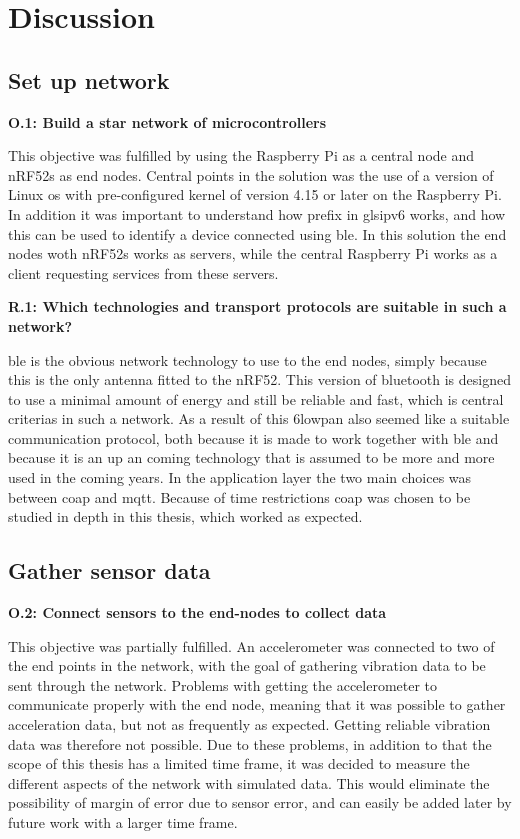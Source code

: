 \chapter{Discussion}
\label{chp:dataAnalysis}

\section{Set up network}

\noindent \textbf{O.1: Build a star network of microcontrollers}

This objective was fulfilled by using the Raspberry Pi as a central node and nRF52s as end nodes. Central points in the solution was the use of a version of Linux \gls{os} with pre-configured kernel of version 4.15 or later on the \gls{Raspberry Pi}. In addition it was important to understand how prefix in gls{ipv6} works, and how this can be used to identify a device connected using \gls{ble}. In this solution the end nodes woth \glspl{nRF52} works as servers, while the central Raspberry Pi works as a client requesting services from these servers. 


\noindent \textbf{R.1: Which technologies and transport protocols are suitable in such a network?}

\gls{ble} is the obvious network technology to use to the end nodes, simply because this is the only antenna fitted to the nRF52. This version of bluetooth is designed to use a minimal amount of energy and still be reliable and fast, which is central criterias in such a network. As a result of this \gls{6lowpan} also seemed like a suitable communication protocol, both because it is made to work together with \gls{ble} and because it is an up an coming technology that is assumed to be more and more used in the coming years. In the application layer the two main choices was between \gls{coap} and \gls{mqtt}. Because of time restrictions \gls{coap} was chosen to be studied in depth in this thesis, which worked as expected. 

\newpage


\section{Gather sensor data}

\noindent\textbf{O.2: Connect sensors to the end-nodes to collect data}

This objective was partially fulfilled. An accelerometer was connected to two of the end points in the network, with the goal of gathering vibration data to be sent through the network. Problems with getting the accelerometer to communicate properly with the end node, meaning that it was possible to gather acceleration data, but not as frequently as expected. Getting reliable vibration data was therefore not possible. Due to these problems, in addition to that the scope of this thesis has a limited time frame, it was decided to measure the different aspects of the network with simulated data. This would eliminate the possibility of margin of error due to sensor error, and can easily be added later by future work with a larger time frame. 

